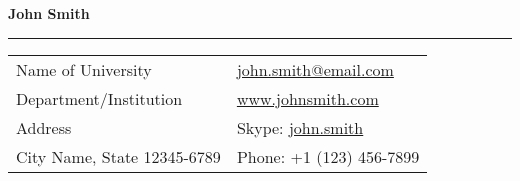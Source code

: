 \documentclass[letterpaper,11pt,oneside]{article}
\newcommand*{\Skype}{\href{skype:john.smith?add}{john.smith}}
\newcommand{\Absender}[1][\normalsize]{\Skype}
\begin{document}

\noindent  \LARGE{\textbf{John Smith}} \\
\vspace{-2ex} 
\hrule 
\normalsize


\begin{center}
\begin{tabular}{l l}
 Name of University    & \hspace{1in} \href{mailto:john.smith@email.com}{john.smith@email.com} \\
 Department/Institution    & \hspace{1in}  \href{www.johnsmith.com}{www.johnsmith.com}   \\
 Address             & \hspace{1in} Skype: \Absender  \\
 City Name, State 12345-6789 & \hspace{1in} Phone: +1 (123) 456-7899 \\
\end{tabular}
\end{center}

\vspace{1em}

\end{document}
